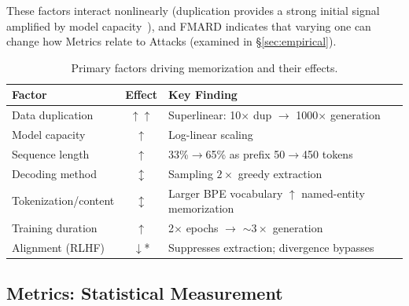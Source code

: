 \documentclass[11pt]{article}
\begin{document}
These factors interact nonlinearly (duplication provides a strong initial
signal amplified by model
capacity~\citep{hernandez2022scaling}), and FMARD indicates that varying one
can change how Metrics relate to Attacks (examined in \S\ref{sec:empirical}).

\begin{table}[t]
\centering
\footnotesize
\setlength{\tabcolsep}{3.0pt}
\begin{tabular}{@{}lcp{3.8cm}@{}}
\toprule
\textbf{Factor} & \textbf{Effect} & \textbf{Key Finding} \\
\midrule
Data duplication  & $\uparrow\uparrow$ & Superlinear: 10$\times$ dup $\to$ 1000$\times$ generation~\citep{kandpal2022deduplicatingtrainingdatamitigates} \\
Model capacity    & $\uparrow$         & Log-linear scaling~\citep{carlini2023quantifyingmemorizationneurallanguage} \\
Sequence length   & $\uparrow$         & 33\%$\to$65\% as prefix 50$\to$450 tokens~\citep{carlini2023quantifyingmemorizationneurallanguage} \\
Decoding method   & $\updownarrow$     & Sampling $2\times$ greedy extraction~\citep{yu2023bag} \\
\rowcolor{orange!20}%
Tokenization/content & $\updownarrow$ & Larger BPE vocabulary $\uparrow$ named-entity memorization~\citep{kharitonov2021bpe} \\
Training duration & $\uparrow$         & 2$\times$ epochs $\to$ ${\sim}3\times$ generation~\citep{kandpal2022deduplicatingtrainingdatamitigates} \\
Alignment (RLHF)  & $\downarrow$*      & Suppresses extraction; divergence bypasses~\citep{nasr2023scalableextractiontrainingdata} \\
\bottomrule
\end{tabular}
\caption{Primary factors driving memorization and their effects.}
\label{tab:factors}
\end{table}


\subsection{Metrics: Statistical Measurement}
\label{sec:metrics}
\end{document}
